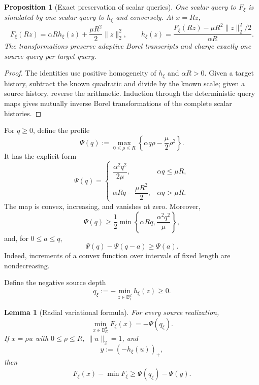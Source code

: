 \documentclass[11pt]{article}
\newcommand{\B}{\mathbb{B}}
\newcommand{\norm}[1]{\lVert #1\rVert_2}
\theoremstyle{plain}
\newtheorem{proposition}[proposition]{Proposition}
\newtheorem{lemma}[lemma]{Lemma}
\theoremstyle{definition}
\begin{document}
\begin{proposition}[Exact preservation of scalar queries]\label{prop:conjugacy}
One scalar query to $F_\xi$ is simulated by one scalar query to $h_\xi$ and conversely.  At $x=Rz$,
\begin{equation}\label{eq:conjugacy}
  F_\xi(Rz)=\alpha R h_\xi(z)+\frac{\mu R^2}{2}\norm{z}^2,
  \qquad
  h_\xi(z)=\frac{F_\xi(Rz)-\mu R^2\norm{z}^2/2}{\alpha R}.
\end{equation}
The transformations preserve adaptive Borel transcripts and charge exactly one source query per target query.
\end{proposition}

\begin{proof}
The identities use positive homogeneity of $h_\xi$ and $\alpha R>0$.  Given a target history, subtract the known quadratic and divide by the known scale; given a source history, reverse the arithmetic.  Induction through the deterministic query maps gives mutually inverse Borel transformations of the complete scalar histories.
\end{proof}

For $q\ge0$, define the profile
\begin{equation}\label{eq:Psi-def}
  \Psi(q):=\max_{0\le\rho\le R}
     \left\{\alpha q\rho-\frac{\mu}{2}\rho^2\right\}.
\end{equation}
It has the explicit form
\begin{equation}\label{eq:Psi-form}
  \Psi(q)=
  \begin{cases}
    \dfrac{\alpha^2q^2}{2\mu},&\alpha q\le\mu R,\\[5pt]
    \alpha Rq-\dfrac{\mu R^2}{2},&\alpha q>\mu R.
  \end{cases}
\end{equation}
The map is convex, increasing, and vanishes at zero.  Moreover,
\begin{equation}\label{eq:Psi-lower}
  \Psi(q)\ge\frac12\min\left\{\alpha Rq,\frac{\alpha^2q^2}{\mu}\right\},
\end{equation}
and, for $0\le a\le q$,
\begin{equation}\label{eq:Psi-increment}
  \Psi(q)-\Psi(q-a)\ge\Psi(a).
\end{equation}
Indeed, increments of a convex function over intervals of fixed length are nondecreasing.

Define the negative source depth
\[
   q_\xi:=-\min_{z\in\B_1^d}h_\xi(z)\ge0.
\]

\begin{lemma}[Radial variational formula]\label{lem:radial}
For every source realization,
\begin{equation}\label{eq:exact-optimum}
   \min_{x\in\B_R^d}F_\xi(x)=-\Psi(q_\xi).
\end{equation}
If $x=\rho u$ with $0\le\rho\le R$, $\norm{u}=1$, and
\[
   y:=(-h_\xi(u))_+,
\]
then
\begin{equation}\label{eq:radial-gap}
   F_\xi(x)-\min F_\xi\ge \Psi(q_\xi)-\Psi(y).
\end{equation}
\end{lemma}
\end{document}
